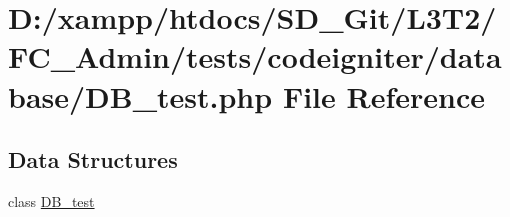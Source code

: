 \hypertarget{_admin_2tests_2codeigniter_2database_2_d_b__test_8php}{}\section{D\+:/xampp/htdocs/\+S\+D\+\_\+\+Git/\+L3\+T2/\+F\+C\+\_\+\+Admin/tests/codeigniter/database/\+D\+B\+\_\+test.php File Reference}
\label{_admin_2tests_2codeigniter_2database_2_d_b__test_8php}
\subsection*{Data Structures}
\begin{DoxyCompactItemize}
\item 
class \hyperlink{class_d_b__test}{D\+B\+\_\+test}
\end{DoxyCompactItemize}
